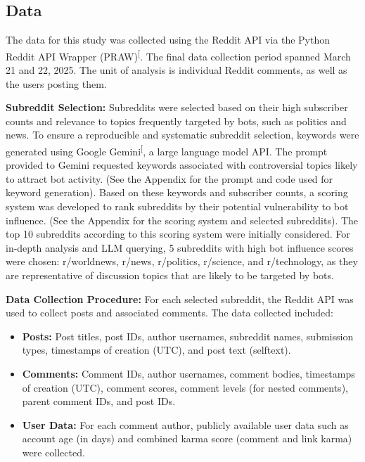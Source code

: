 \documentclass[
  12pt,
  letterpaper,
  DIV=11,
  numbers=noendperiod]{scrartcl}
\providecommand{\tightlist}{%
  \setlength{\itemsep}{0pt}\setlength{\parskip}{0pt}}\usepackage{longtable,booktabs,array}
\begin{document}
\subsection{Data}\label{data}

The data for this study was collected using the Reddit API via the
Python Reddit API Wrapper
(PRAW)\textsuperscript{{[}\citeproc{ref-praw2024}{18}{]}}. The final
data collection period spanned March 21 and 22, 2025. The unit of
analysis is individual Reddit comments, as well as the users posting
them.

\textbf{Subreddit Selection:} Subreddits were selected based on their
high subscriber counts and relevance to topics frequently targeted by
bots, such as politics and news. To ensure a reproducible and systematic
subreddit selection, keywords were generated using Google
Gemini\textsuperscript{{[}\citeproc{ref-googleai2023gemini}{19}{]}}, a
large language model API. The prompt provided to Gemini requested
keywords associated with controversial topics likely to attract bot
activity. (See the Appendix for the prompt and code used for keyword
generation). Based on these keywords and subscriber counts, a scoring
system was developed to rank subreddits by their potential vulnerability
to bot influence. (See the Appendix for the scoring system and selected
subreddits). The top 10 subreddits according to this scoring system were
initially considered. For in-depth analysis and LLM querying, 5
subreddits with high bot influence scores were chosen: r/worldnews,
r/news, r/politics, r/science, and r/technology, as they are
representative of discussion topics that are likely to be targeted by
bots.

\textbf{Data Collection Procedure:} For each selected subreddit, the
Reddit API was used to collect posts and associated comments. The data
collected included:

\begin{itemize}
\tightlist
\item
  \textbf{Posts:} Post titles, post IDs, author usernames, subreddit
  names, submission types, timestamps of creation (UTC), and post text
  (selftext).
\item
  \textbf{Comments:} Comment IDs, author usernames, comment bodies,
  timestamps of creation (UTC), comment scores, comment levels (for
  nested comments), parent comment IDs, and post IDs.
\item
  \textbf{User Data:} For each comment author, publicly available user
  data such as account age (in days) and combined karma score (comment
  and link karma) were collected.
\end{itemize}
\end{document}
